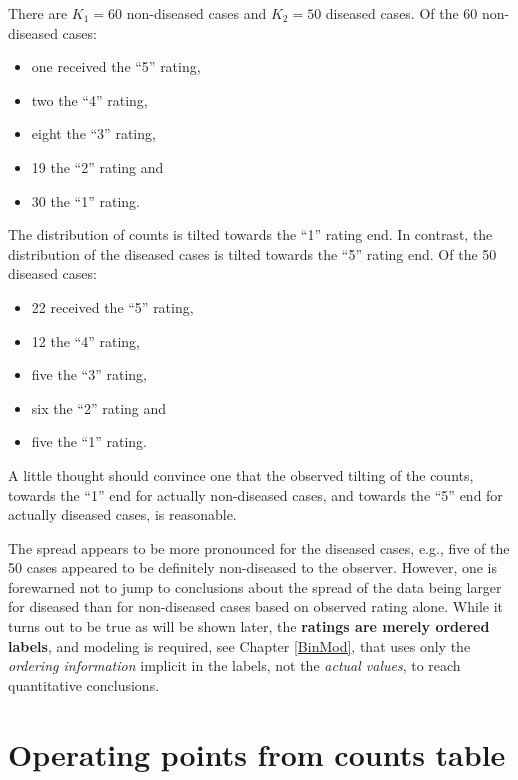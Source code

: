 \documentclass[
]{book}
\providecommand{\tightlist}{%
  \setlength{\itemsep}{0pt}\setlength{\parskip}{0pt}}
\begin{document}
There are \(K_1 = 60\) non-diseased cases and \(K_2 = 50\) diseased cases. Of the 60 non-diseased cases:

\begin{itemize}
\tightlist
\item
  one received the ``5'' rating,
\item
  two the ``4'' rating,
\item
  eight the ``3'' rating,
\item
  19 the ``2'' rating and
\item
  30 the ``1'' rating.
\end{itemize}

The distribution of counts is tilted towards the ``1'' rating end. In contrast, the distribution of the diseased cases is tilted towards the ``5'' rating end. Of the 50 diseased cases:

\begin{itemize}
\tightlist
\item
  22 received the ``5'' rating,
\item
  12 the ``4'' rating,
\item
  five the ``3'' rating,
\item
  six the ``2'' rating and
\item
  five the ``1'' rating.
\end{itemize}

A little thought should convince one that the observed tilting of the counts, towards the ``1'' end for actually non-diseased cases, and towards the ``5'' end for actually diseased cases, is reasonable.

The spread appears to be more pronounced for the diseased cases, e.g., five of the 50 cases appeared to be definitely non-diseased to the observer. However, one is forewarned not to jump to conclusions about the spread of the data being larger for diseased than for non-diseased cases based on observed rating alone. While it turns out to be true as will be shown later, the \textbf{ratings are merely ordered labels}, and modeling is required, see Chapter \ref{BinMod}, that uses only the \emph{ordering information} implicit in the labels, not the \emph{actual values}, to reach quantitative conclusions.

\hypertarget{operating-points-from-counts-table}{%
\section{Operating points from counts table}\label{operating-points-from-counts-table}}
\end{document}
